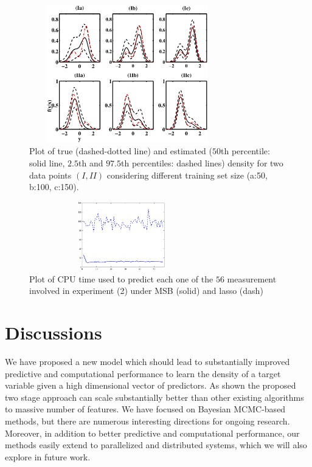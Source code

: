 \documentclass{article}
\begin{document}
\begin{figure}
\centering
\includegraphics[width=85mm,height=60mm]{densityestimate.eps}
\caption{Plot of true (dashed-dotted line) and estimated ($50$th percentile: solid line, $2.5$th and $97.5$th percentiles: dashed lines) density for two data points $(I, II)$ considering different training set size (a:50, b:100, c:150). } \label{plotDensity}
\end{figure}

\begin{figure}
\centering
\includegraphics[width=80mm,height=30mm]{Time_real.eps}
\caption{Plot of CPU time used to predict each one of the $56$ measurement involved in experiment (2) under MSB (solid) and lasso (dash)} \label{fig:real}
\end{figure}


\section*{Discussions}
We have proposed a new model which should lead to substantially improved predictive and computational performance to learn the density of a target variable given a high dimensional vector of predictors. As shown the proposed two stage approach can scale substantially better than other existing algorithms to massive number of features. We have focused on Bayesian MCMC-based methods, but there are numerous interesting directions for ongoing research.
Moreover, in addition to better predictive and computational performance, our methods easily extend to parallelized and distributed systems, which we will also explore in future work.






\end{document}
